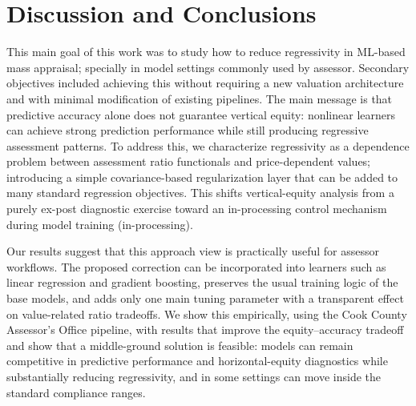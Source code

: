 \documentclass[12pt, draft]{article}
\theoremstyle{plain}
\theoremstyle{definition}
\newcommand{\1}{\mathbf{1}}
\begin{document}







\section{Discussion and Conclusions}

This main goal of this work was to study how to reduce regressivity in ML-based mass appraisal; specially in model settings commonly used by assessor. Secondary objectives included achieving this without requiring a new valuation architecture and with minimal modification of existing pipelines. The main message is that predictive accuracy alone does not guarantee vertical equity: nonlinear learners can achieve strong prediction performance while still producing regressive assessment patterns. To address this, we characterize regressivity as a dependence problem between assessment ratio functionals and price-dependent values; introducing a simple covariance-based regularization layer that can be added to many standard regression objectives. This shifts vertical-equity analysis from a purely ex-post diagnostic exercise toward an in-processing control mechanism during model training (in-processing).

Our results suggest that this approach view is practically useful for assessor workflows. The proposed correction can be incorporated into learners such as linear regression and gradient boosting, preserves the usual training logic of the base models, and adds only one main tuning parameter with a transparent effect on value-related ratio tradeoffs. We show this empirically, using the Cook County Assessor's Office pipeline, with results that improve the equity--accuracy tradeoff and show that a middle-ground solution is feasible: models can remain competitive in predictive performance and horizontal-equity diagnostics while substantially reducing regressivity, and in some settings can move inside the standard compliance ranges.
\end{document}
